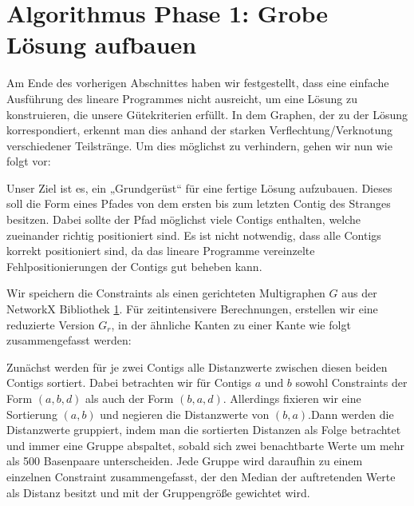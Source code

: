 



\newpage
\section{Algorithmus Phase 1: Grobe Lösung aufbauen}

Am Ende des vorherigen Abschnittes haben wir festgestellt, dass eine einfache Ausführung des lineare Programmes nicht ausreicht, um eine Lösung zu konstruieren, die unsere Gütekriterien erfüllt. 
In dem Graphen, der zu der Lösung korrespondiert, erkennt man dies anhand der starken Verflechtung/Verknotung verschiedener Teilstränge. Um dies möglichst zu verhindern, gehen wir nun wie folgt vor:

Unser Ziel ist es, ein „Grundgerüst“ für eine fertige Lösung aufzubauen.
Dieses soll die Form eines Pfades von dem ersten bis zum letzten Contig des Stranges besitzen.
Dabei sollte der Pfad möglichst viele Contigs enthalten, welche zueinander richtig positioniert sind.
Es ist nicht notwendig, dass alle Contigs korrekt positioniert sind, da das lineare Programme vereinzelte Fehlpositionierungen der Contigs gut beheben kann. 


Wir speichern die Constraints als einen gerichteten Multigraphen $G$ aus der NetworkX Bibliothek \ref{}.
Für zeitintensivere Berechnungen, erstellen wir eine reduzierte Version $G_r$, in der ähnliche Kanten 
zu einer Kante wie folgt zusammengefasst werden:

Zunächst werden für je zwei Contigs alle Distanzwerte zwischen diesen beiden Contigs sortiert. Dabei betrachten wir für Contigs $a$ und $b$ sowohl Constraints der Form $(a, b, d)$ als auch der Form $(b, a, d)$. Allerdings fixieren wir eine Sortierung $(a, b)$ und negieren die Distanzwerte von $(b, a)$.Dann werden die Distanzwerte gruppiert, indem man die sortierten Distanzen als Folge betrachtet und immer eine Gruppe abspaltet, sobald sich zwei benachtbarte Werte um mehr als 500 Basenpaare unterscheiden. Jede Gruppe wird daraufhin zu einem einzelnen Constraint zusammengefasst, der den Median der auftretenden Werte als Distanz besitzt und mit der Gruppengröße gewichtet wird.

